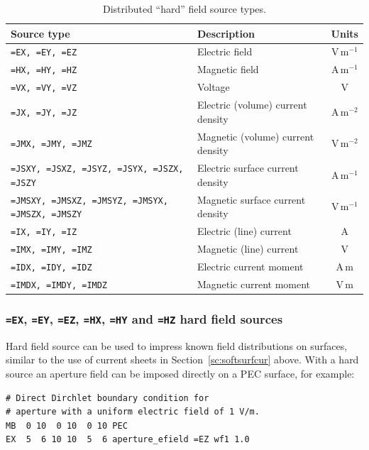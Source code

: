 \documentclass[onecolumn,a4paper]{article}
\numberwithin{equation}{section}
\begin{document}
\begin{table}[ht]
\begin{center}
\begin{tabular}{|l|l|c|}\hline
Source type                                             &Description                        &Units       \\
\hline
\texttt{=EX, =EY, =EZ}                                  &Electric field                     &V\,m$^{-1}$ \\
\texttt{=HX, =HY, =HZ}                                  &Magnetic field                     &A\,m$^{-1}$ \\
\texttt{=VX, =VY, =VZ}                                  &Voltage                            &V           \\
\texttt{=JX, =JY, =JZ}                                  &Electric (volume) current density  &A\,m$^{-2}$ \\
\texttt{=JMX, =JMY, =JMZ}                               &Magnetic (volume) current density  &V\,m$^{-2}$ \\
\texttt{=JSXY, =JSXZ, =JSYZ, =JSYX, =JSZX, =JSZY}       &Electric surface current density   &A\,m$^{-1}$ \\
\texttt{=JMSXY, =JMSXZ, =JMSYZ, =JMSYX, =JMSZX, =JMSZY} &Magnetic surface current density   &V\,m$^{-1}$ \\
\texttt{=IX, =IY, =IZ}                                  &Electric (line) current            &A           \\
\texttt{=IMX, =IMY, =IMZ}                               &Magnetic (line) current            &V           \\
\texttt{=IDX, =IDY, =IDZ}                               &Electric current moment            &A\,m        \\
\texttt{=IMDX, =IMDY, =IMDZ}                            &Magnetic current moment            &V\,m        \\
\hline
\end{tabular}
\caption{\label{tb:exhard}Distributed ``hard'' field source types.}
\end{center}
\end{table}

\subsubsection{\texttt{=EX}, \texttt{=EY}, \texttt{=EZ}, \texttt{=HX}, \texttt{=HY} and \texttt{=HZ} hard field sources}

Hard field source can be used to impress known field distributions on surfaces, similar to the use
of current sheets in Section~\ref{sc:softsurfcur} above. With a hard source an aperture field can be imposed directly
on a PEC surface, for example:
\begin{verbatim}
# Direct Dirchlet boundary condition for
# aperture with a uniform electric field of 1 V/m.
MB  0 10  0 10  0 10 PEC
EX  5  6 10 10  5  6 aperture_efield =EZ wf1 1.0
\end{verbatim}
\end{document}
